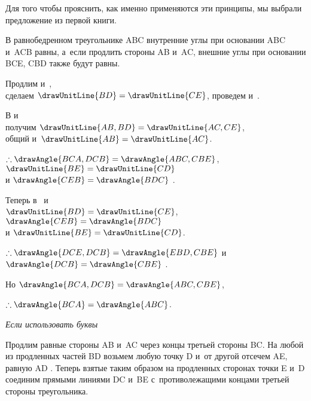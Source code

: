 \documentclass[letters]{byrne-book}
\begin{document}
Для того чтобы прояснить, как именно применяются эти принципы, мы выбрали предложение из первой книги.

В равнобедренном треугольнике ABC внутренние углы при основании ABC и~ACB равны, а~если продлить стороны AB и~AC, внешние углы при основании BCE, CBD также будут равны.

\begin{center}
\drawCurrentPictureInMargin Продлим  и~,\\
сделаем $\drawUnitLine{BD} = \drawUnitLine{CE}$, проведем  и~.

В
и
\\
получим $\drawUnitLine{AB,BD} = \drawUnitLine{AC,CE}$,\\
 общий и~$\drawUnitLine{AB} = \drawUnitLine{AC}$.

$\therefore \drawAngle{BCA,DCB} = \drawAngle{ABC,CBE}$, $\drawUnitLine{BE} = \drawUnitLine{CD}$\\
и $\drawAngle{CEB} = \drawAngle{BDC}$ .

Теперь в~ и~\\
$\drawUnitLine{BD} = \drawUnitLine{CE}$, $\drawAngle{CEB} = \drawAngle{BDC}$\\
и $\drawUnitLine{BE} = \drawUnitLine{CD}$.

$\therefore \drawAngle{DCE,DCB} = \drawAngle{EBD,CBE}$
и $\drawAngle{DCB} = \drawAngle{CBE}$ .

Но $\drawAngle{BCA,DCB} = \drawAngle{ABC,CBE}$, 

$\therefore \drawAngle{BCA} = \drawAngle{ABC}$.
\end{center}

\qedNB

\begin{center}
\emph{Если использовать буквы}
\end{center}

Продлим равные стороны AB и~AC через концы третьей стороны BC. На любой из продленных частей BD возьмем любую точку D и~от другой отсечем AE, равную AD . Теперь взятые таким образом на продленных сторонах точки E и~D соединим прямыми линиями DC и~BE с~противолежащими концами третьей стороны треугольника.
\end{document}
